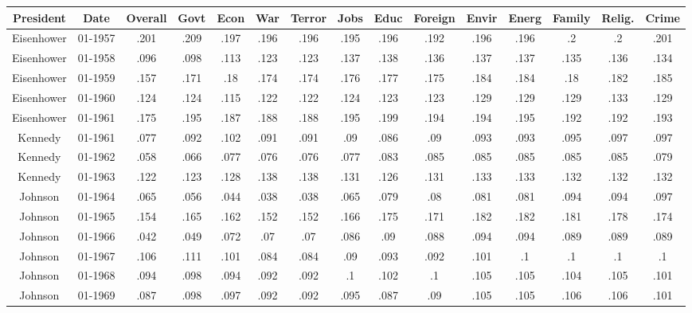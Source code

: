\begin{sidewaystable}
\begin{singlespace}
\begin{center}
 \begin{tabular}{||c c c c c c c c c c c c c c c||}
 \hline
 President & Date & Overall & Govt & Econ & War & Terror & Jobs & Educ & Foreign & Envir & Energ & Family & Relig. & Crime \\
 \hline\hline
Eisenhower & 01-1957 & .201 & .209 & .197 & .196 & .196 & .195 & .196 & .192 & .196 & .196 & .2 & .2 & .201 \\ 
\hline
Eisenhower & 01-1958 & .096 & .098 & .113 & .123 & .123 & .137 & .138 & .136 & .137 & .137 & .135 & .136 & .134 \\ 
\hline
Eisenhower & 01-1959 & .157 & .171 & .18 & .174 & .174 & .176 & .177 & .175 & .184 & .184 & .18 & .182 & .185 \\ 
\hline
Eisenhower & 01-1960 & .124 & .124 & .115 & .122 & .122 & .124 & .123 & .123 & .129 & .129 & .129 & .133 & .129 \\ 
\hline
Eisenhower & 01-1961 & .175 & .195 & .187 & .188 & .188 & .195 & .199 & .194 & .194 & .195 & .192 & .192 & .193 \\ 
\hline
Kennedy & 01-1961 & .077 & .092 & .102 & .091 & .091 & .09 & .086 & .09 & .093 & .093 & .095 & .097 & .097 \\ 
\hline
Kennedy & 01-1962 & .058 & .066 & .077 & .076 & .076 & .077 & .083 & .085 & .085 & .085 & .085 & .085 & .079 \\ 
\hline
Kennedy & 01-1963 & .122 & .123 & .128 & .138 & .138 & .131 & .126 & .131 & .133 & .133 & .132 & .132 & .132 \\ 
\hline
Johnson & 01-1964 & .065 & .056 & .044 & .038 & .038 & .065 & .079 & .08 & .081 & .081 & .094 & .094 & .097 \\ 
\hline
Johnson & 01-1965 & .154 & .165 & .162 & .152 & .152 & .166 & .175 & .171 & .182 & .182 & .181 & .178 & .174 \\ 
\hline
Johnson & 01-1966 & .042 & .049 & .072 & .07 & .07 & .086 & .09 & .088 & .094 & .094 & .089 & .089 & .089 \\ 
\hline
Johnson & 01-1967 & .106 & .111 & .101 & .084 & .084 & .09 & .093 & .092 & .101 & .1 & .1 & .1 & .1 \\ 
\hline
Johnson & 01-1968 & .094 & .098 & .094 & .092 & .092 & .1 & .102 & .1 & .105 & .105 & .104 & .105 & .101 \\ 
\hline
Johnson & 01-1969 & .087 & .098 & .097 & .092 & .092 & .095 & .087 & .09 & .105 & .105 & .106 & .106 & .101 \\ 

\end{tabular}
\end{center}
\end{singlespace}
\end{sidewaystable}
